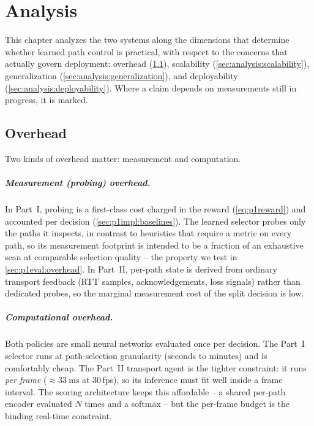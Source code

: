 \chapter{Analysis}
\label{ch:analysis}

This chapter analyzes the two systems along the dimensions that determine whether learned path control is
practical, with respect to the concerns that actually govern deployment: overhead
(\cref{sec:analysis:overhead}), scalability (\cref{sec:analysis:scalability}), generalization
(\cref{sec:analysis:generalization}), and deployability (\cref{sec:analysis:deployability}). Where a claim
depends on measurements still in progress, it is marked.

\section{Overhead}
\label{sec:analysis:overhead}

Two kinds of overhead matter: measurement and computation.

\paragraph{Measurement (probing) overhead.} In Part~I, probing is a first-class cost charged in the reward
(\cref{eq:p1reward}) and accounted per decision (\cref{sec:p1impl:baselines}). The learned selector probes
only the paths it inspects, in contrast to heuristics that require a metric on every path, so its
measurement footprint is intended to be a fraction of an exhaustive scan at comparable selection quality --
the property we test in \cref{sec:p1eval:overhead}. In Part~II, per-path state is derived from ordinary
transport feedback (RTT samples, acknowledgements, loss signals) rather than dedicated probes, so the
marginal measurement cost of the split decision is low.

\paragraph{Computational overhead.} Both policies are small neural networks evaluated once per decision.
The Part~I selector runs at path-selection granularity (seconds to minutes) and is comfortably cheap. The
Part~II transport agent is the tighter constraint: it runs \emph{per frame} (${\approx}\SI{33}{\milli\second}$
at 30\,fps), so its inference must fit well inside a frame interval. The scoring architecture keeps this
affordable -- a shared per-path encoder evaluated $N$ times and a softmax -- but the per-frame budget is the
binding real-time constraint. 

